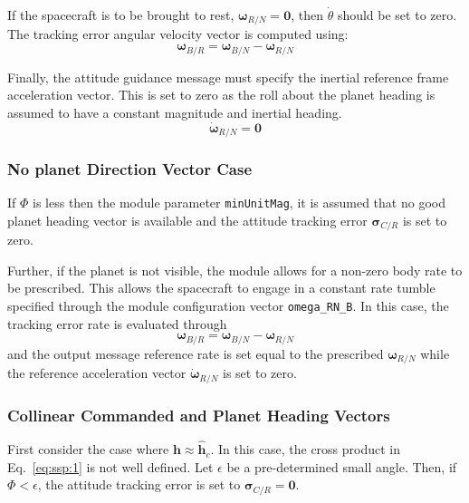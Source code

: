 If the spacecraft is to be brought to rest, $\bm\omega_{R/N} = \bm 0$, then $\dot\theta$ should be set to zero.  The tracking error angular velocity vector is computed using:
\begin{equation}
	\label{eq:ssp:4}
	\bm\omega_{B/R} = \bm\omega_{B/N} - \bm\omega_{R/N}
\end{equation}

Finally, the attitude guidance message must specify the inertial reference frame  acceleration vector.  This is set to zero as the roll about the planet heading is assumed to have a constant magnitude and inertial heading.
\begin{equation}
	\dot{\bm \omega}_{R/N} = \bm 0
\end{equation}

\subsubsection{No planet Direction Vector Case}
 If $\Phi$ is less then the module parameter {\tt minUnitMag}, it is assumed that no good planet heading vector is available and the attitude tracking error $\bm\sigma_{C/R}$ is set to zero.   
 
 Further, if the planet is not visible, the module allows for a non-zero body rate to be prescribed.  This allows the spacecraft to engage in a constant rate tumble specified through the module configuration vector {\tt omega\_RN\_B}.  In this case, the tracking error rate is evaluated through
 \begin{equation}
 	\label{eq:ssp:6}
	\bm\omega_{B/R} = \bm\omega_{B/N} - \bm\omega_{R/N}
 \end{equation}
 and the output message reference rate is set equal to the prescribed $\bm\omega_{R/N}$ while the reference acceleration vector $\dot{\bm \omega}_{R/N}$ is set to zero.

 
 \subsubsection{Collinear Commanded and Planet Heading Vectors}
First consider the case where $\bm h \approx \hat{\bm h}_{c}$.  In this case, the cross product in Eq.~\eqref{eq:ssp:1} is not well defined.  Let $\epsilon$ be a pre-determined small angle.  Then, if $\Phi < \epsilon$, the attitude tracking error is set to $\bm\sigma_{C/R} = \bm 0$.
 
